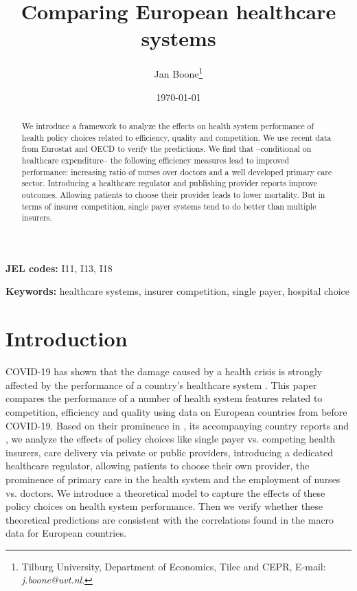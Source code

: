 \documentclass[a4paper,12pt]{article}
\author{Jan Boone\thanks{Tilburg University, Department of Economics, Tilec and CEPR, E-mail: \textit{j.boone@uvt.nl}.}}
\date{\today}
\title{Comparing European healthcare systems}
\begin{document}
\maketitle
\begin{abstract}
We introduce a framework to analyze the effects on health system performance of health policy choices related to efficiency, quality and competition. We use recent data from Eurostat and OECD to verify the predictions. We find that --conditional on healthcare expenditure-- the following efficiency measures lead to improved performance:  increasing ratio of nurses over doctors and a well developed primary care sector. Introducing a healthcare regulator and publishing provider reports improve outcomes. Allowing patients to choose their provider leads to lower mortality. But in terms of insurer competition, single payer systems tend to do better than multiple insurers.
\end{abstract}

\textbf{JEL codes:} I11, I13, I18

\textbf{Keywords:} healthcare systems, insurer competition, single payer, hospital choice



\newpage

\section{Introduction}
\label{sec:org876f6cb}

COVID-19 has shown that the damage caused by a health crisis is strongly affected by the performance of a country's healthcare system \citep{OECD_2020}. This paper compares the performance of a number of health system features related to competition, efficiency and quality using data on European countries from before COVID-19. Based on their prominence in \cite{countryprofileReport}, its accompanying country reports and \cite{OECD_2020}, we analyze the effects of policy choices like single payer vs. competing health insurers, care delivery via private or public providers, introducing a dedicated healthcare regulator, allowing patients to choose their own provider, the prominence of primary care in the health system and the employment of nurses vs. doctors. We introduce a theoretical model to capture the effects of these policy choices on health system performance. Then we verify whether these theoretical predictions are consistent with the correlations found in the macro data for European countries.
\end{document}
